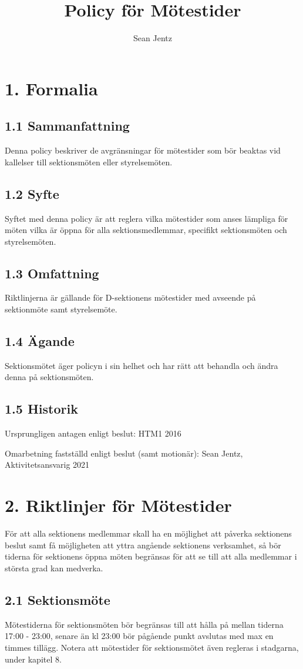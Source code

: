 \documentclass[]{dsekkallelse}
\title{Policy för Mötestider}
\author{Sean Jentz}
\begin{document}
\section{1. Formalia}

\subsection{1.1 Sammanfattning}
Denna policy beskriver de avgränsningar för mötestider som bör beaktas vid kallelser till sektionsmöten eller styrelsemöten.

\subsection{1.2 Syfte}
Syftet med denna policy är att reglera vilka mötestider som anses lämpliga för möten vilka är öppna för alla sektionsmedlemmar, specifikt sektionsmöten och styrelsemöten.

\subsection{1.3 Omfattning}
Riktlinjerna är gällande för D-sektionens mötestider med avseende på sektionmöte samt styrelsemöte.

\subsection{1.4 Ägande}
Sektionsmötet äger policyn i sin helhet och har rätt att behandla och ändra denna på sektionsmöten.

\subsection{1.5 Historik}
Ursprungligen antagen enligt beslut: HTM1 2016

Omarbetning fastställd enligt beslut (samt motionär): Sean Jentz, Aktivitetsansvarig 2021

\section{2. Riktlinjer för Mötestider}
För att alla sektionens medlemmar skall ha en möjlighet att påverka sektionens beslut samt få möjligheten att yttra angående sektionens verksamhet, så bör tiderna för sektionens öppna möten begränsas för att se till att alla medlemmar i största grad kan medverka.

\subsection{2.1 Sektionsmöte}
Mötestiderna för sektionsmöten bör begränsas till att hålla på mellan tiderna 17:00 -
23:00, senare än kl 23:00 bör pågående punkt avslutas med max en timmes tillägg. 
Notera att mötestider för sektionsmötet även regleras i stadgarna, under kapitel 8.
\end{document}
